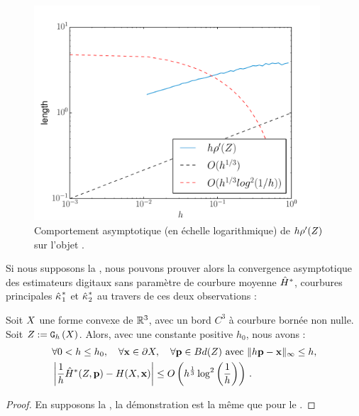 \begin{figure}[ht]{
  \begin{center}
    \includegraphics[height=8cm]{images/Curvature/Ellipsoid_Radius}
  \end{center}}
    \caption{Comportement asymptotique (en échelle logarithmique) de $h\rho'( Z )$ sur l'objet \Ellipsoid.
    \label{fig:bounds-length-MDSS-fig}}
\end{figure}


Si nous supposons la , nous pouvons prouver
alors la convergence asymptotique des estimateurs digitaux sans paramètre de
courbure moyenne $\hat{H}^{*}$, courbures principales $\hat{\kappa_{}}_{1}^{*}$ et
$\hat{\kappa_{}}_{2}^{*}$ au travers de ces deux observations :
%
\begin{observation}{}
  \label{obs:curvature-estimator-3d-mean-pf-conv}
  Soit $X$ une forme convexe de $\mathbb{R}^3$, avec un bord $C^3$ à
  courbure bornée non nulle. Soit $Z := \mathtt{G}_{h}\left(X\right)$. Alors, avec une
  constante positive $h_0$, nous avons :
  \begin{align}
    &\forall 0 < h \le h_0, \quad \forall \mathbf{x} \in \partial X, \quad \forall \mathbf{p} \in Bd({Z}) \text{~avec~} \| h\mathbf{p} -\mathbf{x}\|_\infty \le h, \nonumber\\
    &\left | \frac{1}{h}\hat{H}^{*}(Z,\mathbf{p}) - H(X,\mathbf{x}) \right| \le O\left( h^{\frac{1}{3}} \log^2 \left(\frac{1}{h}\right)\right) \,.
  \end{align}
\end{observation}
\begin{proof}
  En supposons la , la démonstration est la
  même que pour le .
\end{proof}

